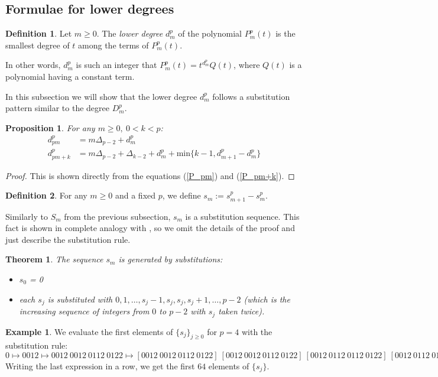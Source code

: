 \documentclass[a4paper]{article}
\theoremstyle{plain}
\newtheorem{theorem}{Theorem}[section]
\newtheorem{proposition}{Proposition}[section]
\theoremstyle{definition}
\newtheorem{definition}{Definition}
\newtheorem*{example}{Example}
\begin{document}
\subsection{Formulae for lower degrees}
\begin{definition}
Let $m \ge 0$. The \emph{lower degree} $d_m^p$ of the polynomial $P_m^p(t)$ is the smallest degree of $t$ among the terms of $P_m^p(t)$.
\end{definition}

In other words, $d_m^p$ is such an integer that $P_m^p(t)=t^{d_m^p}Q(t)$, where $Q(t)$ is a polynomial having a constant term.

In this subsection we will show that the lower degree $d_m^p$ follows a substitution pattern similar to the degree $D_m^p$.
\begin{proposition}
For any $m \ge 0,\ 0 < k < p$:
\begin{align*}
  d_{pm}^p &= m \Delta_{p-2} + d_m^p \\
  d_{pm+k}^p &= m \Delta_{p-2}+\Delta_{k-2}+d_m^p + \mathrm{min}\{k-1, d_{m+1}^p-d_m^p\}
\end{align*}
\end{proposition}
\begin{proof}
This is shown directly from the equations (\ref{P_pm}) and (\ref{P_pm+k}).
\end{proof}
\begin{definition} \label{lower_sm_def}
For any $m \ge 0$ and a fixed $p$, we define $s_m := s_{m+1}^p - s_m^p $.
\end{definition}

Similarly to $S_m$ from the previous subsection, $s_m$ is a substitution sequence. This fact is shown in complete analogy with , so we omit the details of the proof and just describe the substitution rule.

\begin{theorem} \label{lower_subst_th}
The sequence $s_m$ is generated by substitutions:
\begin{itemize}
\item $s_0$ = 0
\item each $s_j$ is substituted with $0, 1, \ldots, s_j-1, s_j, s_j, s_j+1, \ldots, p-2$ (which is the increasing sequence of integers from $0$ to $p-2$ with $s_j$ taken twice).
\end{itemize}
\end{theorem}
\begin{example}
We evaluate the first elements of $\{s_j\}_{j \ge 0}$ for $p=4$ with the substitution rule:
$0 \mapsto 0012 \mapsto 0012\ 0012\ 0112\ 0122 \mapsto [0012\ 0012\ 0112\ 0122]\ [0012\ 0012\ 0112\ 0122]\  [0012\ 0112\ 0112\ 0122]\ [0012\ 0112\ 0122\ 0122] \mapsto \ldots$
Writing the last expression in a row, we get the first $64$ elements of $\{s_j\}$.
\end{example}
\end{document}

